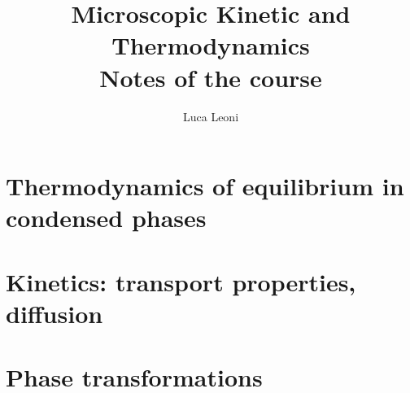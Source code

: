 \documentclass[12pt]{report}
\title{\Huge{Microscopic Kinetic and Thermodynamics}\\Notes of the course}
\author{\huge{Luca Leoni}}
\date{}
\begin{document}
    \maketitle

    \tableofcontents

    \chapter{Thermodynamics of equilibrium in condensed phases}
    
    
    
    

    \chapter{Kinetics: transport properties, diffusion}
    
    
    
    

    \chapter{Phase transformations}
    
    
\end{document}
